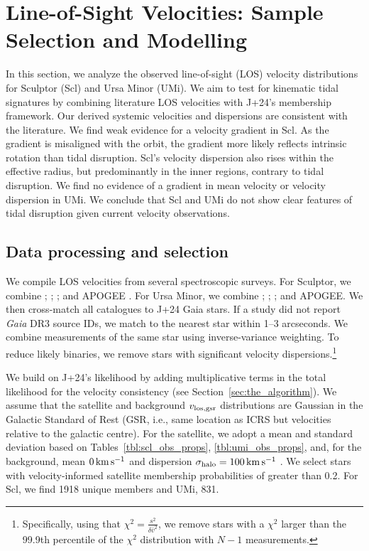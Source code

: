\chapter{Line-of-Sight Velocities: Sample Selection and
Modelling}\label{sec:extra_rv_models}

In this section, we analyze the observed line-of-sight (LOS) velocity
distributions for Sculptor (Scl) and Ursa Minor (UMi). We aim to test
for kinematic tidal signatures by combining literature LOS velocities
with J+24's membership framework. Our derived systemic velocities and
dispersions are consistent with the literature. We find weak evidence
for a velocity gradient in Scl. As the gradient is misaligned with the
orbit, the gradient more likely reflects intrinsic rotation than tidal
disruption. Scl's velocity dispersion also rises within the effective
radius, but predominantly in the inner regions, contrary to tidal
disruption. We find no evidence of a gradient in mean velocity or
velocity dispersion in UMi. We conclude that Scl and UMi do not show
clear features of tidal disruption given current velocity observations.

\section{Data processing and
selection}\label{data-processing-and-selection}

We compile LOS velocities from several spectroscopic surveys. For
Sculptor, we combine \citet{tolstoy+2023}; \citet{walker+2009};
\citet{sestito+2023a}; and APOGEE \citep[DR17,][]{abdurrouf+2022}. For
Ursa Minor, we combine \citet{spencer+2018}; \citet{pace+2020};
\citet{sestito+2023b}; and APOGEE. We then cross-match all catalogues to
J+24 Gaia stars. If a study did not report \emph{Gaia} DR3 source IDs,
we match to the nearest star within 1--3 arcseconds. We combine
measurements of the same star using inverse-variance weighting. To
reduce likely binaries, we remove stars with significant velocity
dispersions.\footnote{Specifically, using that
  \(\chi^2=\frac{s^2}{\delta \bar v^2}\), we remove stars with a
  \(\chi^2\) larger than the 99.9th percentile of the \(\chi^2\)
  distribution with \(N-1\) measurements.}

We build on J+24's likelihood by adding multiplicative terms in the
total likelihood for the velocity consistency (see
Section~\ref{sec:the_algorithm}). We assume that the satellite and
background \(v_{\rm los, gsr}\) distributions are Gaussian in the
Galactic Standard of Rest (GSR, i.e., same location as ICRS but
velocities relative to the galactic centre). For the satellite, we adopt
a mean and standard deviation based on
Tables~\ref{tbl:scl_obs_props}, \ref{tbl:umi_obs_props}, and, for the
background, mean \(0\,{\rm km\,s^{-1}}\) and dispersion
\(\sigma_{\rm halo} = 100\,{\rm km\,s^{-1}}\) \citep[e.g.][]{brown+2010}. We select
stars with velocity-informed satellite membership probabilities of
greater than 0.2. For Scl, we find 1918 unique members and UMi, 831.


